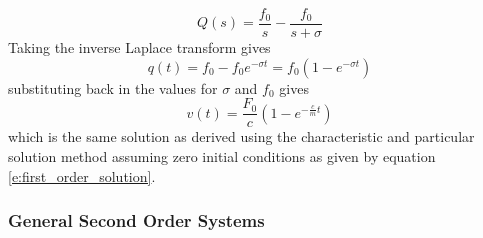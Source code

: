 \begin{equation}
    Q(s) = \frac{f_0}{s} - \frac{f_0}{s+\sigma}
\end{equation}
Taking the inverse Laplace transform gives
\begin{equation}
    q(t) = f_0 - f_0 e^{-\sigma t} = f_0(1 - e^{-\sigma t})
\end{equation}
substituting back in the values for $\sigma$ and $f_0$ gives
\begin{equation}
    v(t) = \frac{F_0}{c}(1 - e^{-\frac{c}{m}t})
\end{equation}
which is the same solution as derived using the characteristic and particular solution method assuming zero initial conditions as given by equation \ref{e:first_order_solution}.

\subsubsection{General Second Order Systems}

